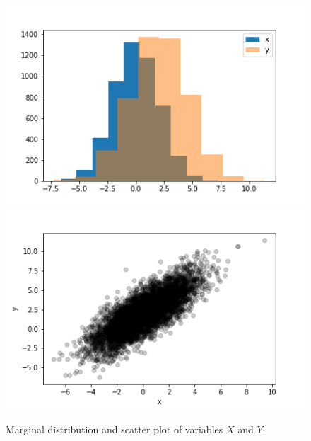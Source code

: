 \documentclass[BCOR=1mm, DIV=calc,10pt,
twoside=true,
twocolumn,
headings=normal]{scrartcl}
\begin{document}
\begin{figure}
\begin{center}
\includegraphics[scale=0.5]{../figures/marginal} \includegraphics[scale=0.5]{../figures/scatter} 
\caption{\label{fig:scatter} Marginal distribution and scatter plot of variables $X$ and $Y$.}
\end{center}
\end{figure} 
\end{document}
